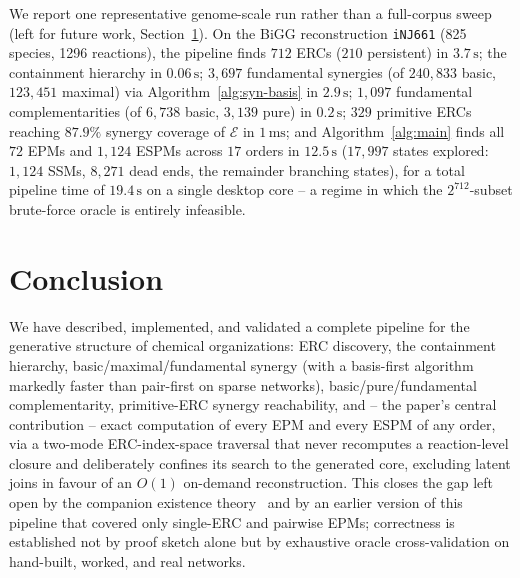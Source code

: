 \documentclass[11pt]{article}
\theoremstyle{plain}
\theoremstyle{remark}
\newcommand{\E}{\mathcal{E}}
\begin{document}
We report one representative genome-scale run rather than a full-corpus
sweep (left for future work, Section~\ref{sec:conclusion}). On the BiGG
reconstruction \texttt{iNJ661} (825 species, 1296 reactions), the pipeline
finds $712$ ERCs ($210$ persistent) in $3.7\,\mathrm{s}$; the containment
hierarchy in $0.06\,\mathrm{s}$; $3{,}697$ fundamental synergies (of
$240{,}833$ basic, $123{,}451$ maximal) via Algorithm~\ref{alg:syn-basis}
in $2.9\,\mathrm{s}$; $1{,}097$ fundamental complementarities (of $6{,}738$
basic, $3{,}139$ pure) in $0.2\,\mathrm{s}$; $329$ primitive ERCs reaching
$87.9\%$ synergy coverage of $\E$ in $1\,\mathrm{ms}$; and
Algorithm~\ref{alg:main} finds all $72$ EPMs and $1{,}124$ ESPMs across
$17$ orders in $12.5\,\mathrm{s}$ ($17{,}997$ states explored: $1{,}124$
SSMs, $8{,}271$ dead ends, the remainder branching states), for a total
pipeline time of $19.4\,\mathrm{s}$ on a single desktop core -- a regime
in which the $2^{712}$-subset brute-force oracle is entirely infeasible.

\section{Conclusion}\label{sec:conclusion}

We have described, implemented, and validated a complete pipeline for the
generative structure of chemical organizations: ERC discovery, the
containment hierarchy, basic/maximal/fundamental synergy (with a
basis-first algorithm markedly faster than pair-first on sparse
networks), basic/pure/fundamental complementarity, primitive-ERC synergy
reachability, and -- the paper's central contribution -- exact
computation of every EPM and every ESPM of any order, via a two-mode
ERC-index-space traversal that never recomputes a reaction-level closure
and deliberately confines its search to the generated core, excluding
latent joins in favour of an $O(1)$ on-demand reconstruction. This closes
the gap left open by the companion existence theory~\cite{BMBcompanion}
and by an earlier version of this pipeline that covered only single-ERC
and pairwise EPMs; correctness is established not by proof sketch alone
but by exhaustive oracle cross-validation on hand-built, worked, and real
networks.
\end{document}
